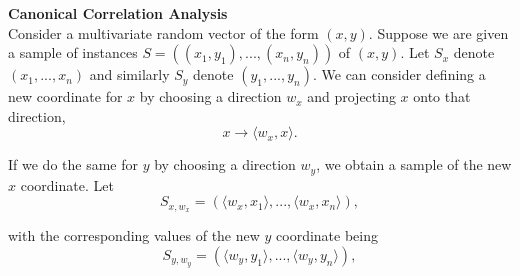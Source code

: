 \documentclass[fleqn,a4paper,12pt]{article}
\begin{document}
\noindent \textbf{Canonical Correlation Analysis} \\


\noindent Consider a multivariate random vector of the form $(x, y)$. Suppose we
are given a sample of instances $S = ((x_{1}, y_{1}), . . . , (x_{n}, y_n))$ of $(x, y)$. Let $S_{x}$ denote $(x_{1},..., x_{n})$ and similarly $S_{y}$ denote $(y_1,..., y_	n)$. We can consider
defining a new coordinate for $x$ by choosing a direction $w_x$ and projecting $x$ onto that direction,
\begin{equation*}
x \rightarrow \langle w_x, x \rangle. 
\end{equation*}

\noindent If we do the same for $y$ by choosing a direction $w_y$, we obtain a sample of the new $x$ coordinate. Let
\begin{equation*}
S_{x,w_x} = ( \langle w_x, x_1 \rangle ,...,\langle w_x, x_n \rangle),
\end{equation*}

\noindent with the  corresponding values of the new $y$ coordinate being
\begin{equation*}
S_{y,w_y} = ( \langle w_y, y_1 \rangle ,...,\langle w_y, y_n \rangle),
\end{equation*}
\end{document}
